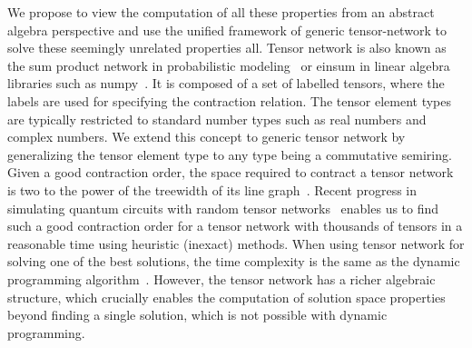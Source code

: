 \documentclass[onefignum, onetabnum]{siamart190516}
\newcommand{\<}{\langle}
\renewcommand{\>}{\rangle}
\newcommand{\blue}[1]{[{\bf  \color{blue}{JG: #1}}]}
\newcommand{\purple}[1]{[{\bf  \color{purple}{MC: #1}}]}
\begin{document}
We propose to view the computation of all these properties from an abstract algebra perspective and use the unified framework of
generic tensor-network to solve these seemingly unrelated properties all.
Tensor network is also known as the sum product network in probabilistic modeling~\cite{Bishop2006} or einsum in linear algebra libraries such as numpy~\cite{Harris2020}.
It is composed of a set of labelled tensors, where the labels are used for specifying the contraction relation.
The tensor element types are typically restricted to standard number types such as real numbers and complex numbers.
We extend this concept to generic tensor network by generalizing the tensor element type to any type being a commutative semiring.
Given a good contraction order, the space required to contract a tensor network is
two to the power of the treewidth of its line graph~\cite{Markov2008}.
Recent progress in simulating quantum circuits with random tensor networks~\cite{Gray2021, Pan2021, Kalachev2021} enables us to find such a good contraction order for a tensor network with thousands of tensors in a reasonable time using heuristic (inexact) methods.
When using tensor network for solving one of the best solutions,
the time complexity is the same as the dynamic programming algorithm~\cite{Courcelle1990, Fomin2013}.
However, the tensor network has a richer algebraic structure, which crucially enables the computation of solution space properties beyond finding a single solution, which is not possible with dynamic programming.
\end{document}
